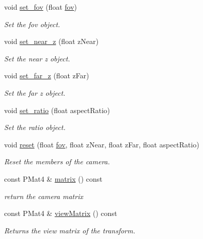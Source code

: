 \begin{DoxyCompactItemize}
void \mbox{\hyperlink{classprz_1_1_camera_a0ea8099b1dd633ee59746efdc7df5e40}{set\+\_\+fov}} (float \mbox{\hyperlink{classprz_1_1_camera_a1424858488672135d41e1376c7c0db11}{fov}})
\begin{DoxyCompactList}\small\item\em Set the fov object. \end{DoxyCompactList}\item 
void \mbox{\hyperlink{classprz_1_1_camera_a50dd11b89b9bfe5b0c0f253f093180df}{set\+\_\+near\+\_\+z}} (float z\+Near)
\begin{DoxyCompactList}\small\item\em Set the near z object. \end{DoxyCompactList}\item 
void \mbox{\hyperlink{classprz_1_1_camera_a6b3de1c2275908dd36659934c6389f48}{set\+\_\+far\+\_\+z}} (float z\+Far)
\begin{DoxyCompactList}\small\item\em Set the far z object. \end{DoxyCompactList}\item 
void \mbox{\hyperlink{classprz_1_1_camera_ad5f11c3aace04adb03d4f7edc7aa9c66}{set\+\_\+ratio}} (float aspect\+Ratio)
\begin{DoxyCompactList}\small\item\em Set the ratio object. \end{DoxyCompactList}\item 
void \mbox{\hyperlink{classprz_1_1_camera_aa2f75c0cf4f1458922fc9d128c671928}{reset}} (float \mbox{\hyperlink{classprz_1_1_camera_a1424858488672135d41e1376c7c0db11}{fov}}, float z\+Near, float z\+Far, float aspect\+Ratio)
\begin{DoxyCompactList}\small\item\em Reset the members of the camera. \end{DoxyCompactList}\item 
const P\+Mat4 \& \mbox{\hyperlink{classprz_1_1_camera_a73be3bc102f3acaaf4abb4893dd3856f}{matrix}} () const
\begin{DoxyCompactList}\small\item\em return the camera matrix \end{DoxyCompactList}\item 
const P\+Mat4 \& \mbox{\hyperlink{classprz_1_1_camera_a5dc5b4ddc7be0671f20c19138141bdd6}{view\+Matrix}} () const
\begin{DoxyCompactList}\small\item\em Returns the view matrix of the transform. \end{DoxyCompactList}\item 

\end{DoxyCompactItemize}
